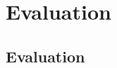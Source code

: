 \documentclass{beamer}
\begin{document}
   

   

 



\section{Evaluation}
\subsection{Evaluation}
\end{document}
